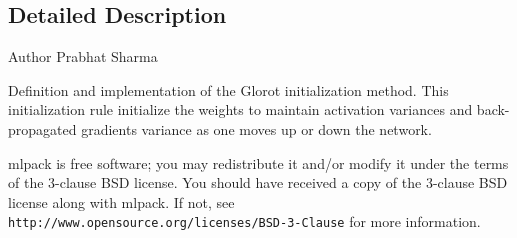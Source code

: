 \subsection{Detailed Description}
\begin{DoxyAuthor}{Author}
Prabhat Sharma
\end{DoxyAuthor}
Definition and implementation of the Glorot initialization method. This initialization rule initialize the weights to maintain activation variances and back-\/propagated gradients variance as one moves up or down the network.

mlpack is free software; you may redistribute it and/or modify it under the terms of the 3-\/clause B\+SD license. You should have received a copy of the 3-\/clause B\+SD license along with mlpack. If not, see {\tt http\+://www.\+opensource.\+org/licenses/\+B\+S\+D-\/3-\/\+Clause} for more information. 